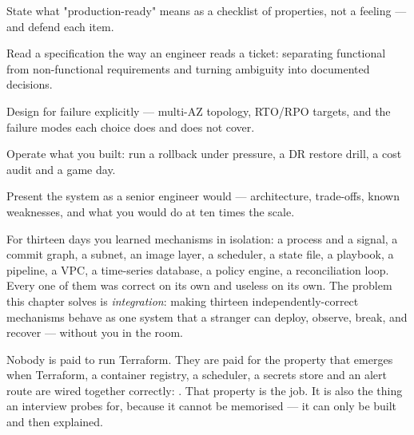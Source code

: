 
\begin{objectives}
\begin{wbitem}
  \item State what "production-ready" means as a checklist of properties, not a feeling --- and defend each item.
  \item Read a specification the way an engineer reads a ticket: separating functional from non-functional requirements and turning ambiguity into documented decisions.
  \item Design for failure explicitly --- multi-AZ topology, RTO/RPO targets, and the failure modes each choice does and does not cover.
  \item Operate what you built: run a rollback under pressure, a DR restore drill, a cost audit and a game day.
  \item Present the system as a senior engineer would --- architecture, trade-offs, known weaknesses, and what you would do at ten times the scale.
\end{wbitem}
\end{objectives}


 For thirteen days you learned mechanisms in isolation: a process and a signal, a commit graph, a subnet, an image layer, a scheduler, a state file, a playbook, a pipeline, a VPC, a time-series database, a policy engine, a reconciliation loop. Every one of them was correct on its own and useless on its own. The problem this chapter solves is \emph{integration}: making thirteen independently-correct mechanisms behave as one system that a stranger can deploy, observe, break, and recover --- without you in the room.

 Nobody is paid to run Terraform. They are paid for the property that emerges when Terraform, a container registry, a scheduler, a secrets store and an alert route are wired together correctly: . That property is the job. It is also the thing an interview probes for, because it cannot be memorised --- it can only be built and then explained.

